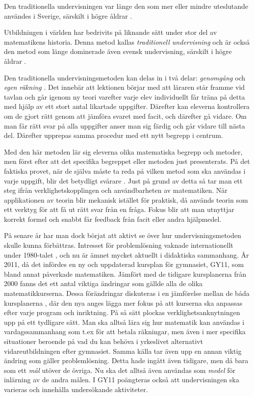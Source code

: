 
\textcolor{lila}{Den traditionella undervisningen var länge den som mer eller mindre uteslutande användes i Sverige, särskilt i högre åldrar \cite{Namnaren}.}

Utbildningen i världen har bedrivits på liknande sätt under stor del av matematikens historia. Denna metod kallas \textsl{traditionell undervisning} och är också den metod som länge dominerade även svensk undervisning, särskilt i högre åldrar \cite{Namnaren}.

\textcolor{lila}{Den traditionella undervisningsmetoden kan delas in i två delar: \textsl{genomgång} och \textsl{egen räkning} \cite{traditionellMatte}. Det innebär att lektionen börjar med att läraren står framme vid tavlan och går igenom ny teori varefter varje elev individuellt får träna på detta med hjälp av ett stort antal likartade uppgifter. Därefter kan eleverna kontrollera om de gjort rätt genom att jämföra svaret med facit, och därefter gå vidare. Om man får rätt svar på alla uppgifter anser man sig färdig och går vidare till nästa del. Därefter upprepas samma procedur med ett nytt begrepp i centrum.} 
    
\textcolor{lila}{Med den här metoden lär sig eleverna olika matematiska begrepp och metoder, men först efter att det specifika begreppet eller metoden just presenterats. På det faktiska provet, när de själva måste ta reda på vilken metod som ska användas i varje uppgift, blir det betydligt svårare \cite{TheElephant}.}
\textcolor{WildStrawberry}{
    Just på grund av detta så tar man ett steg ifrån verklighetskopplingen och användbarheten av matematiken. När applikationen av teorin blir mekanisk istället för praktisk, då används teorin som ett verktyg för att få ut rätt svar från en fråga. Fokus blir att man utnyttjar korrekt formel och snabbt får feedback från facit eller andra hjälpmedel. }


\textcolor{lila}{På senare år har man dock börjat att aktivt se över hur undervisningsmetoden skulle kunna förbättras. Intresset för problemlösning vaknade internationellt under 1980-talet \cite{80-talet}, och nu är ämnet mycket aktuellt i didaktiska sammanhang. År 2011, då det infördes en ny och uppdaterad kursplan för gymnasiet, GY11, som bland annat påverkade matematiken. Jämfört med de tidigare kursplanerna från 2000 fanns det ett antal viktiga ändringar som gällde alla de olika matematikkurserna. 
Dessa förändringar diskuteras i en jämförelse mellan de båda kursplanerna \cite{GY00-GY11}, där den nya anges lägga mer fokus på att kurserna ska anpassas efter varje program och inriktning. På så sätt plockas verklighetsanknytningen upp på ett tydligare sätt. Man ska alltså lära sig hur matematik kan användas i vardagssammanhang som t.ex för att betala räkningar, men även i mer specifika situationer beroende på vad du kan behöva i yrkeslivet alternativt vidareutbildningen efter gymnasiet. 
Samma källa tar även upp en annan viktig ändring som gäller problemlösning. Detta hade ingått även tidigare, men då bara som ett \textsl{mål} utöver de övriga. Nu ska det alltså även användas som \textsl{medel} för inlärning av de andra målen. I GY11 poängteras också att undervisningen ska varieras och innehålla undersökande aktiviteter.}

